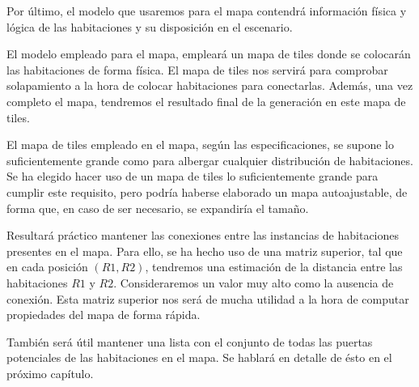 Por último, el modelo que usaremos para el mapa contendrá información física y lógica de las habitaciones y su disposición en el escenario.

El modelo empleado para el mapa, empleará un mapa de tiles donde se colocarán las habitaciones de forma física. El mapa de tiles nos servirá para comprobar solapamiento a la hora de colocar habitaciones para conectarlas. Además, una vez completo el mapa, tendremos el resultado final de la generación en este mapa de tiles. 

El mapa de tiles empleado en el mapa, según las especificaciones, se supone lo suficientemente grande como para albergar cualquier distribución de habitaciones. Se ha elegido hacer uso de un mapa de tiles lo suficientemente grande para cumplir este requisito, pero podría haberse elaborado un mapa autoajustable, de forma que, en caso de ser necesario, se expandiría el tamaño.

Resultará práctico mantener las conexiones entre las instancias de habitaciones presentes en el mapa. Para ello, se ha hecho uso de una matriz superior, tal que en cada posición $(R1,R2)$, tendremos una estimación de la distancia entre las habitaciones $R1$ y $R2$. Consideraremos un valor muy alto como la ausencia de conexión. Esta matriz superior nos será de mucha utilidad a la hora de computar propiedades del mapa de forma rápida.

También será útil mantener una lista con el conjunto de todas las puertas potenciales de las habitaciones en el mapa. Se hablará en detalle de ésto en el próximo capítulo.
